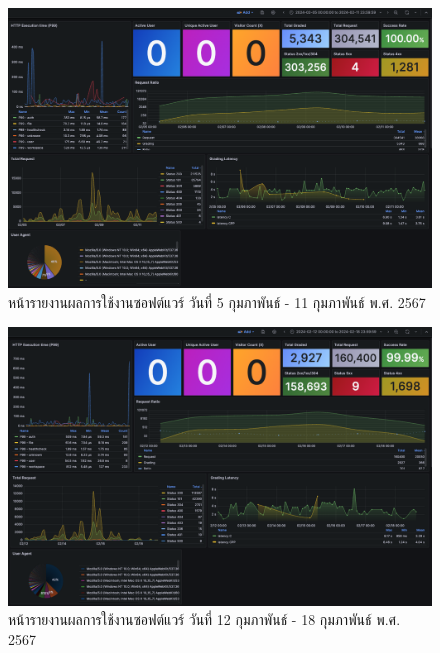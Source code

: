 \documentclass[12pt,one side,openright,a4paper]{cpe-thesis-th}
\begin{document}
\begin{figure}[H]
  \centering
  \includegraphics[width=15cm]{figure/results/grafana/grafana-feb05-feb11.png}
  \caption[หน้ารายงานผลการใช้งานซอฟต์แวร์ วันที่ 5 กุมภาพันธ์ - 11 กุมภาพันธ์ พ.ศ. 2567]{หน้ารายงานผลการใช้งานซอฟต์แวร์ วันที่ 5 กุมภาพันธ์ - 11 กุมภาพันธ์ พ.ศ. 2567}
  \label{fig:res-grafana-f05f11}
\end{figure}

\begin{figure}[H]
  \centering
  \includegraphics[width=15cm]{figure/results/grafana/grafana-feb12-feb18.png}
  \caption[หน้ารายงานผลการใช้งานซอฟต์แวร์ วันที่ 12 กุมภาพันธ์ - 18 กุมภาพันธ์ พ.ศ. 2567]{หน้ารายงานผลการใช้งานซอฟต์แวร์ วันที่ 12 กุมภาพันธ์ - 18 กุมภาพันธ์ พ.ศ. 2567}
  \label{fig:res-grafana-f12f18}
\end{figure}
\end{document}
